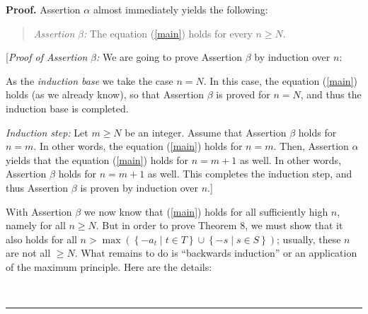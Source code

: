 \documentclass[numbers=enddot,12pt,final,onecolumn,notitlepage]{scrartcl}%
\numberwithin{exer}{section}
\theoremstyle{definition}
\newenvironment{statement}{\begin{quote}}{\end{quote}}
\newenvironment{proof}[1][Proof]{\noindent\textbf{#1.} }{\ \rule{0.5em}{0.5em}}
\begin{document}
\begin{proof}
Assertion $\alpha$ almost immediately yields the following:

\begin{statement}
\textit{Assertion }$\beta$\textit{:} The equation (\ref{main}) holds for every
$n\geq N$.
\end{statement}

[\textit{Proof of Assertion }$\beta$\textit{:} We are going to prove Assertion
$\beta$ by induction over $n$:

As the \textit{induction base} we take the case $n=N$. In this case, the
equation (\ref{main}) holds (as we already know), so that Assertion $\beta$ is
proved for $n=N$, and thus the induction base is completed.

\textit{Induction step:} Let $m\geq N$ be an integer. Assume that Assertion
$\beta$ holds for $n=m$. In other words, the equation (\ref{main}) holds for
$n=m$. Then, Assertion $\alpha$ yields that the equation (\ref{main}) holds
for $n=m+1$ as well. In other words, Assertion $\beta$ holds for $n=m+1$ as
well. This completes the induction step, and thus Assertion $\beta$ is proven
by induction over $n$.]

With Assertion $\beta$ we now know that (\ref{main}) holds for all
sufficiently high $n$, namely for all $n\geq N$. But in order to prove Theorem
8, we must show that it also holds for all $n>\max\left(  \left\{  -a_{t}\mid
t\in T\right\}  \cup\left\{  -s\mid s\in S\right\}  \right)  $; usually, these
$n$ are not all $\geq N$. What remains to do is ``backwards induction'' or an
application of the maximum principle. Here are the details:


\end{proof}
\end{document}
